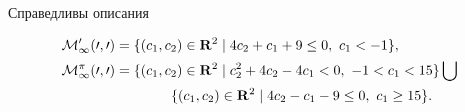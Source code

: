 \begin{lem}


Справедливы описания


\begin{align*}


\cal M^0_1(0,0)&=\{(c_1,c_2)\in\bold R^2\mid


4c_2+c_1+9\le 0,\ c_1<-1\}, \\


%


\cal M^\pi_1(0,0)&=\{(c_1,c_2)\in\bold R^2\mid


c^2_2+4c_2-4c_1<0, \ -1<c_1<15\}\bigcup\\


&\qquad\qquad\{(c_1,c_2)\in\bold R^2\mid 4c_2-c_1-9\le 0,\ c_1\ge 15\}.


\end{align*}


\end{lem}





